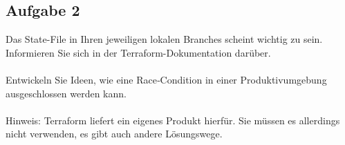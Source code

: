 \documentclass{article}
\begin{document}
    \subsection{Aufgabe 2}
Das State-File in Ihren jeweiligen lokalen Branches scheint wichtig zu sein. Informieren Sie sich in der Terraform-Dokumentation darüber. \\ \\
    Entwickeln Sie Ideen, wie eine Race‑Condition in einer Produktivumgebung ausgeschlossen werden kann. \\ \\
    Hinweis: Terraform liefert ein eigenes Produkt hierfür. Sie müssen es allerdings nicht verwenden, es gibt auch andere Lösungswege.

    
\end{document}
